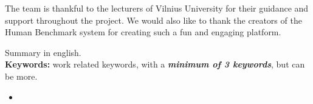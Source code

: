 \documentclass[]{VUMIFTemplateClass}
\newcommand{\EE}{\mathbb{E}\,} %
\begin{document}

\onehalfspacing


The team is thankful to the lecturers of Vilnius University for their guidance and support throughout the project. We would also like to thank the creators of the Human Benchmark system for creating such a fun and engaging platform.




Summary in english.\\

\textbf{Keywords:} work related keywords, with a \textit{\textbf{minimum of 3 keywords}}, but can be more.





\singlespacing
{}

\listoffigures 

\listoftables

\tableofcontents
\onehalfspacing

\begin{itemize}
    \item 
\end{itemize}


\end{document}
